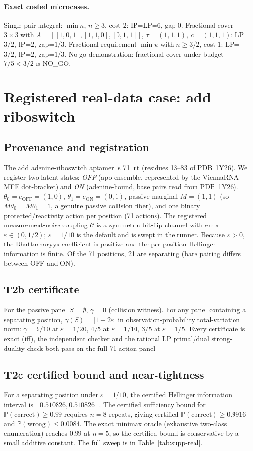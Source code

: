 \documentclass[11pt]{article}
\begin{document}
\paragraph{Exact costed microcases.}
Single-pair integral: $\min n$, $n\ge3$, cost $2$: IP=LP=$6$, gap $0$. Fractional cover $3\times3$ with
$A=[[1,0,1],[1,1,0],[0,1,1]]$, $\tau=(1,1,1)$, $c=(1,1,1)$: LP=$3/2$, IP=$2$, gap=$1/3$. Fractional
requirement $\min n$ with $n\ge3/2$, cost $1$: LP=$3/2$, IP=$2$, gap=$1/3$. No-go demonstration:
fractional cover under budget $7/5<3/2$ is NO\_GO.

\section{Registered real-data case: add riboswitch}\label{sec:supp-real}
\subsection{Provenance and registration}
The add adenine-riboswitch aptamer is 71~nt (residues 13--83 of PDB~1Y26). We register two latent
states: \emph{OFF} (apo ensemble, represented by the ViennaRNA MFE dot-bracket) and \emph{ON}
(adenine-bound, base pairs read from PDB~1Y26). $\theta_0=e_{\mathrm{OFF}}=(1,0)$,
$\theta_1=e_{\mathrm{ON}}=(0,1)$, passive marginal $M=(1,1)$ (so $M\theta_0=M\theta_1=1$, a genuine
passive collision fiber), and one binary protected/reactivity action per position (71 actions). The
registered measurement-noise coupling $\mathcal{C}$ is a symmetric bit-flip channel with error
$\varepsilon\in(0,1/2)$; $\varepsilon=1/10$ is the default and is swept in the runner. Because
$\varepsilon>0$, the Bhattacharyya coefficient is positive and the per-position Hellinger information
is finite. Of the 71 positions, 21 are separating (bare pairing differs between OFF and ON).

\subsection{T2b certificate}
For the passive panel $S=\emptyset$, $\gamma=0$ (collision witness). For any panel containing a
separating position, $\gamma(S)=|1-2\varepsilon|$ in observation-probability total-variation norm: $\gamma=9/10$ at
$\varepsilon=1/20$, $4/5$ at $\varepsilon=1/10$, $3/5$ at $\varepsilon=1/5$. Every certificate is exact
(iff), the independent checker and the rational LP primal/dual strong-duality check both pass on the
full 71-action panel.

\subsection{T2c certified bound and near-tightness}
For a separating position under $\varepsilon=1/10$, the certified Hellinger information interval is
$[0.510826,0.510826]$. The certified sufficiency bound for
$\mathbb{P}(\mathrm{correct})\ge0.99$ requires $n=8$ repeats, giving certified
$\mathbb{P}(\mathrm{correct})\ge0.9916$ and $\mathbb{P}(\mathrm{wrong})\le0.0084$. The exact minimax
oracle (exhaustive two-class enumeration) reaches $0.99$ at $n=5$, so the certified bound is
conservative by a small additive constant. The full sweep is in Table~\ref{tab:supp-real}.
\end{document}
